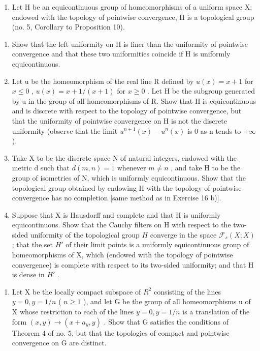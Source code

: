 \begin{enumerate}
\def\labelenumi{\arabic{enumi})}
\setcounter{enumi}{18}
\tightlist
\item
  Let H be an equicontinuous group of homeomorphisms of a uniform space X; endowed with the topology of pointwise convergence, H is a topological group (no. 5, Corollary to Proposition 10).
\end{enumerate}

\begin{enumerate}
\def\labelenumi{\alph{enumi})}
\item
  Show that the left uniformity on H is finer than the uniformity of pointwise convergence and that these two uniformities coincide if H is uniformly equicontinuous.
\item
  Let u be the homeomorphism of the real line R defined by \(u(x) = x + 1\) for \(x \leqslant 0\) , \(u(x) = x + 1/(x + 1)\) for \(x \geqslant 0\) . Let H be the subgroup generated by u in the group of all homeomorphisms of R. Show that H is equicontinuous and is discrete with respect to the topology of pointwise convergence, but that the uniformity of pointwise convergence on H is not the discrete uniformity (observe that the limit \(u^{n+1}(x) - u^n(x)\) is 0 as n tends to \(+\infty\) ).
\item
  Take X to be the discrete space N of natural integers, endowed with the metric d such that \(d(m, n) = 1\) whenever \(m \neq n\) , and take H to be the group of isometries of N, which is uniformly equicontinuous. Show that the topological group obtained by endowing H with the topology of pointwise convergence has no completion {[}same method as in Exercise 16 b){]}.
\item
  Suppose that X is Hausdorff and complete and that H is uniformly equicontinuous. Show that the Cauchy filters on H with respect to the two-sided uniformity of the topological group \(H\) converge in the space \(\mathcal{F}_s(X;X)\) ; that the set \(H'\) of their limit points is a uniformly equicontinuous group of homeomorphisms of X, which (endowed with the topology of pointwise convergence) is complete with respect to its two-sided uniformity; and that H is dense in \(H'\) .
\end{enumerate}

\begin{enumerate}
\def\labelenumi{\arabic{enumi})}
\setcounter{enumi}{19}
\tightlist
\item
  Let X be the locally compact subspace of \(R^{2}\) consisting of the lines \(y = 0, y = 1/n\) ( \(n \geqslant 1\) ), and let G be the group of all homeomorphisms u of X whose restriction to each of the lines \(y = 0, y = 1/n\) is a translation of the form \((x, y) \to (x + a_{y}, y)\) . Show that G satisfies the conditions of Theorem 4 of no. 5, but that the topologies of compact and pointwise convergence on G are distinct.
\end{enumerate}

